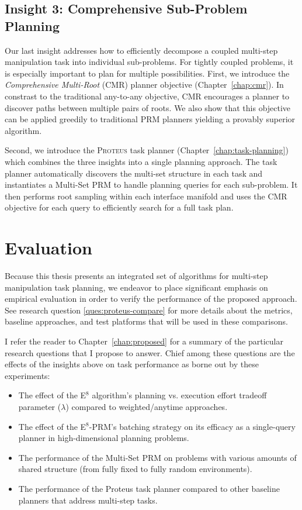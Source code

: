 \subsection*{Insight 3: Comprehensive Sub-Problem Planning}

Our last insight addresses how to efficiently decompose a coupled
multi-step manipulation task into individual sub-problems.
For tightly coupled problems,
it is especially important to plan for multiple possibilities.
First, we introduce the \emph{Comprehensive Multi-Root} (CMR) planner
objective (Chapter~\ref{chap:cmr}).
In constrast to the traditional any-to-any objective,
CMR encourages a planner to discover paths between multiple pairs of
roots.
We also show that this objective can be applied greedily
to traditional PRM planners
yielding a provably superior algorithm. 

Second,
we introduce the \textsc{Proteus} task planner
(Chapter~\ref{chap:task-planning})
which combines the three insights into a single planning approach.
The task planner
automatically discovers the multi-set structure in each task
and instantiates a Multi-Set PRM to handle planning queries
for each sub-problem.
It then performs root sampling within each interface manifold
and uses the CMR objective for each query to
efficiently search for a full task plan.

\section*{Evaluation}

Because this thesis presents an integrated set of algorithms
for multi-step manipulation task planning,
we endeavor to place significant emphasis on empirical evaluation
in order to verify the performance of the proposed approach.
See research question \ref{ques:proteus-compare} for more details
about the metrics, baseline approaches, and test platforms
that will be used in these comparisons.

I refer the reader to Chapter~\ref{chap:proposed} for a summary
of the particular research questions that I propose to answer.
Chief among these questions are the effects of the insights above
on task performance as borne out by these experiments:
\begin{itemize}
\itemsep-3pt
\item The effect of the E$^8$ algorithm's planning vs. execution
   effort tradeoff parameter ($\lambda$)
   compared to weighted/anytime approaches.
\item The effect of the E$^8$-PRM's batching strategy on its efficacy
   as a single-query planner in high-dimensional planning
   problems.
\item The performance of the Multi-Set PRM on problems with various
   amounts of shared structure
   (from fully fixed to fully random environments).
\item The performance of the {\sc Proteus} task planner
   compared to other baseline planners that address multi-step tasks.
\end{itemize}

